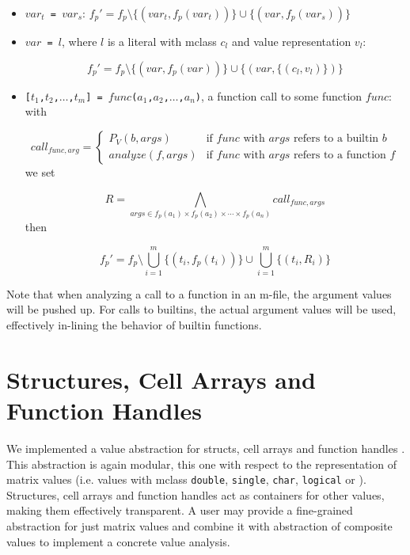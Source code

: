 \begin{itemize}
\item {\tt $var_t$ = $var_s$}: \hspace{.5cm}
$ f_p' = f_p \setminus \{(var_t,f_p(var_t))\} \cup \{(var,f_p(var_s))\}$
\item {\tt $var$ = $l$}, where $l$ is a literal with mclass $c_l$ and value representation $v_l$:

\begin{equation*}
f_p' = f_p \setminus \{(var,f_p(var))\} \cup \{(var,\{(c_l,v_l)\})\}
\end{equation*}
\item {\tt [$t_1$,$t_2$,$\ldots$,$t_m$] = $func$($a_1$,$a_2$,$\ldots$,$a_n$)}, a function call to some function $func$:
\\
with

\begin{equation*}
call_{func,arg} =
\left\{
    \begin{array}{ll}
       P_V(b, args)        & \mbox{if $func$ with $args$ refers to a builtin $b$} \\
       analyze(f, args) & \mbox{if $func$ with $args$ refers to a function $f$}
    \end{array}
\right.
\end{equation*}
we set

\begin{equation*}
R = \bigwedge_{args \in f_p(a_1) \times f_p(a_2) \times \cdots \times f_p(a_n)  } call_{func,args}
\end{equation*}
then

\begin{equation*}
f_p' = f_p \setminus \bigcup_{i = 1}^m \{ (t_i,f_p(t_i))\} \cup \bigcup_{i = 1}^m \{(t_i,R_i)\}
\end{equation*}
\end{itemize}


Note that when analyzing a call to a function in an m-file, the argument values will be
pushed up. For calls to builtins, the actual argument values will be
used, effectively in-lining the behavior of builtin functions.

\section{Structures, Cell Arrays and Function Handles}
\label{sec:composite}
We implemented a value abstraction for structs, cell arrays and
function handles . 
This abstraction is again modular, this one with
respect to the representation of matrix values (i.e. values with
mclass {\tt double}, {\tt single}, {\tt char}, {\tt logical} or
). Structures, cell arrays and function handles act as
containers for other values, making them effectively transparent.  A
user may provide a fine-grained abstraction for just matrix values and
combine it with  abstraction of composite values to implement a
concrete value analysis.

